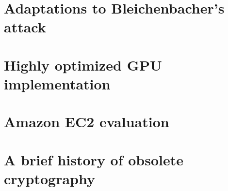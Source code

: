 
\section{Adaptations to Bleichenbacher's attack}


\balance

\section{Highly optimized GPU implementation}


\section{Amazon EC2 evaluation}


\section{A brief history of obsolete cryptography}

